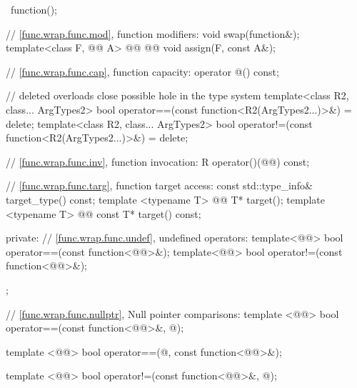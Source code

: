 \documentclass[american,twoside]{book}
\begin{document}
\begin{codeblock}
{{    ~function();

    // \ref{func.wrap.func.mod}, function modifiers:
    void swap(function&);
    template<class F, @@ A> 
      @@ 
               @@
      void assign(F, const A&);

    // \ref{func.wrap.func.cap}, function capacity:
    operator @\unspecbool@() const;

    // deleted overloads close possible hole in the type system
    template<class R2, class... ArgTypes2>
        bool operator==(const function<R2(ArgTypes2...)>&) = delete;
    template<class R2, class... ArgTypes2>
        bool operator!=(const function<R2(ArgTypes2...)>&) = delete;

    // \ref{func.wrap.func.inv}, function invocation:
    R operator()(@@) const;

    // \ref{func.wrap.func.targ}, function target access:
    const std::type_info& target_type() const;
    template <typename T> 
      @@
      T* target();
    template <typename T> 
      @@
      const T* target() const;

  private:
    // \ref{func.wrap.func.undef}, undefined operators:
    template<@@> bool operator==(const function<@@>&);
    template<@@> bool operator!=(const function<@@>&);
  };

  // \ref{func.wrap.func.nullptr}, Null pointer comparisons:
  template <@@>
    bool operator==(const function<@@>&, @\unspecnull@);

  template <@@>
    bool operator==(@\unspecnull@, const function<@@>&);

  template <@@>
    bool operator!=(const function<@@>&, @\unspecnull@);

}
\end{codeblock}
\end{document}

